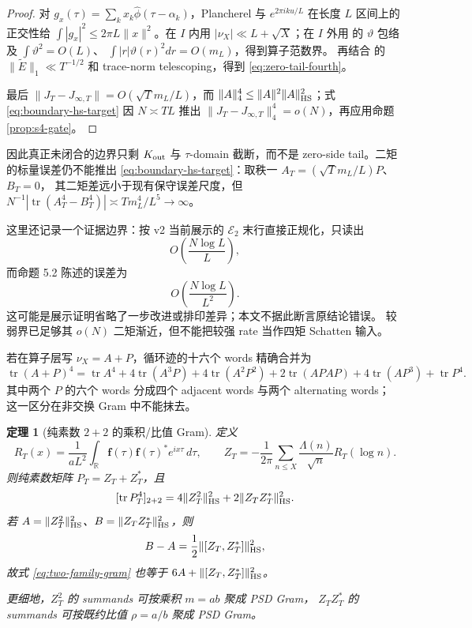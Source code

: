 \documentclass[UTF8,11pt,a4paper]{ctexart}
\newtheorem{theorem}{定理}[section]
\theoremstyle{definition}
\theoremstyle{remark}
\newcommand{\tr}{\operatorname{tr}}
\begin{document}
\begin{proof}
对 $g_x(\tau)=\sum_kx_k\widehat\phi(\tau-\alpha_k)$，Plancherel 与
$e^{2\pi iku/L}$ 在长度 $L$ 区间上的正交性给
$\int|g_x|^2\le2\pi L\|x\|^2$。在 $I$ 内用
$|\nu_X|\ll L+\sqrt X$；在 $I$ 外用 \cite[(5.3)--(5.4)]{AF26} 的
$\vartheta$ 包络及 $\int\vartheta^2=O(L)$、
$\int |r|\vartheta(r)^2dr=O(m_L)$，得到算子范数界。
再结合 \cite[Prop.~4.3]{AF26} 的
$\|\widetilde E\|_1\ll T^{-1/2}$ 和 trace-norm telescoping，得到
\eqref{eq:zero-tail-fourth}。

最后 $\|J_T-J_{\infty,T}\|=O(\sqrt Tm_L/L)$，而
$\|A\|_4^4\le\|A\|^2\|A\|_{\rm HS}^2$；式
\eqref{eq:boundary-hs-target} 因 $N\asymp TL$ 推出
$\|J_T-J_{\infty,T}\|_4^4=o(N)$，再应用命题 \ref{prop:s4-gate}。
\end{proof}

因此真正未闭合的边界只剩 $K_{\rm out}$ 与 $\tau$-domain 截断，而不是
zero-side tail。二矩的标量误差仍不能推出
\eqref{eq:boundary-hs-target}：取秩一 $A_T=(\sqrt Tm_L/L)P$、$B_T=0$，
其二矩差远小于现有保守误差尺度，但
$N^{-1}|\tr(A_T^4-B_T^4)|\asymp Tm_L^4/L^5\to\infty$。

这里还记录一个证据边界：按 \cite[\S5.2]{AF26} v2 当前展示的
$\mathcal E_2$ 末行直接正规化，只读出
\[
 O\!\left(\frac{N\log L}{L}\right),
\]
而命题 5.2 陈述的误差为
\[
 O\!\left(\frac{N\log L}{L^2}\right).
\]
这可能是展示证明省略了一步改进或排印差异；本文不据此断言原结论错误。
较弱界已足够其 $o(N)$ 二矩渐近，但不能把较强 rate 当作四矩 Schatten 输入。

若在算子层写 $\nu_X=A+P$，循环迹的十六个 words 精确合并为
\[
 \tr(A+P)^4
 =\tr A^4+4\tr(A^3P)+4\tr(A^2P^2)
 +2\tr(APAP)+4\tr(AP^3)+\tr P^4.
 \label{eq:cyclic-words}
\]
其中两个 $P$ 的六个 words 分成四个 adjacent words 与两个 alternating words；
这一区分在非交换 Gram 中不能抹去。

\begin{theorem}[纯素数 $2+2$ 的乘积/比值 Gram]\label{thm:product-ratio-gram}
定义
\[
 R_T(x)=\frac1{aL^2}\int_{\mathbb R}
 \mathbf f(\tau)\mathbf f(\tau)^*e^{ix\tau}\,d\tau,
 \qquad
 Z_T=-\frac1{2\pi}\sum_{n\le X}\frac{\Lambda(n)}{\sqrt n}R_T(\log n).
\]
则纯素数矩阵 $P_T=Z_T+Z_T^*$，且
\[
 [\tr P_T^4]_{2+2}
 =4\|Z_T^2\|_{\rm HS}^2+2\|Z_TZ_T^*\|_{\rm HS}^2.
 \label{eq:two-family-gram}
\]
若 $A=\|Z_T^2\|_{\rm HS}^2$、$B=\|Z_TZ_T^*\|_{\rm HS}^2$，则
\[
 B-A=\frac12\|[Z_T,Z_T^*]\|_{\rm HS}^2,
\]
故式 \eqref{eq:two-family-gram} 也等于
$6A+\|[Z_T,Z_T^*]\|_{\rm HS}^2$。

更细地，$Z_T^2$ 的 summands 可按乘积 $m=ab$ 聚成 PSD Gram，
$Z_TZ_T^*$ 的 summands 可按既约比值 $\rho=a/b$ 聚成 PSD Gram。
\end{theorem}
\end{document}
